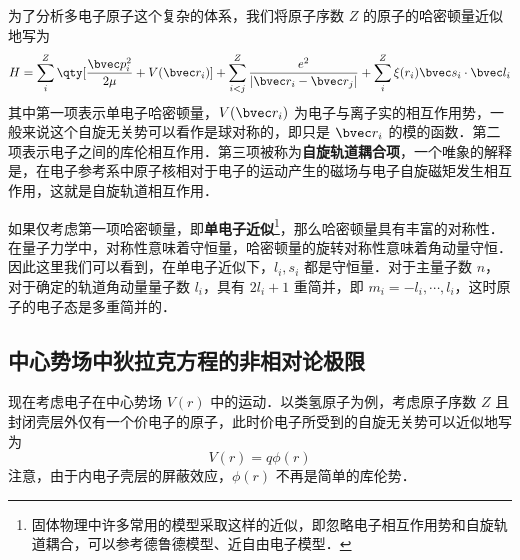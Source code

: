 
为了分析多电子原子这个复杂的体系，我们将原子序数 $Z$ 的原子的哈密顿量近似地写为
\begin{equation}
H=\sum_{i}^{Z} \qty[\frac{\bvec p_i^2}{2\mu} +V(\bvec r_i)]+\sum_{i<j}^Z \frac{e^2}{|\bvec r_i-\bvec r_j|}+\sum_i^Z \xi(r_i)\bvec s_i\cdot \bvec l_i
\end{equation}
其中第一项表示单电子哈密顿量，$V(\bvec r_i)$ 为电子与离子实的相互作用势，一般来说这个自旋无关势可以看作是球对称的，即只是 $\bvec r_i$ 的模的函数．第二项表示电子之间的库伦相互作用．第三项被称为\textbf{自旋轨道耦合项}，一个唯象的解释是，在电子参考系中原子核相对于电子的运动产生的磁场与电子自旋磁矩发生相互作用，这就是自旋轨道相互作用．

如果仅考虑第一项哈密顿量，即\textbf{单电子近似}\footnote{固体物理中许多常用的模型采取这样的近似，即忽略电子相互作用势和自旋轨道耦合，可以参考德鲁德模型、近自由电子模型．}，那么哈密顿量具有丰富的对称性．在量子力学中，对称性意味着守恒量，哈密顿量的旋转对称性意味着角动量守恒．因此这里我们可以看到，在单电子近似下，$l_i,s_i$ 都是守恒量．对于主量子数 $n$，对于确定的轨道角动量量子数 $l_i$，具有 $2 l_i+1$ 重简并，即 $m_{i}=-l_i,\cdots,l_i$，这时原子的电子态是多重简并的．
\subsection{中心势场中狄拉克方程的非相对论极限}
现在考虑电子在中心势场 $V(r)$ 中的运动．以类氢原子为例，考虑原子序数 $Z$ 且封闭壳层外仅有一个价电子的原子，此时价电子所受到的自旋无关势可以近似地写为
\begin{equation}
V(r)=q\phi(r)
\end{equation}
注意，由于内电子壳层的屏蔽效应，$\phi(r)$ 不再是简单的库伦势．